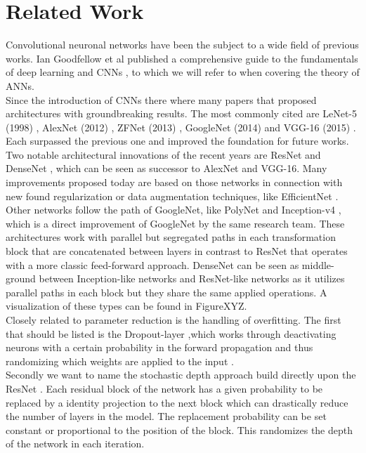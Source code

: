 \documentclass[a4paper,12pt,titlepage,enabledeprecatedfontcommands]{scrreprt}
\begin{document}
\chapter{Related Work}
Convolutional neuronal networks have been the subject to a wide field of previous works. Ian Goodfellow et al published a comprehensive guide to the fundamentals of deep learning and CNNs \cite{Goodfellow-et-al-2016}, to which we will refer to when covering the theory of ANNs. \\
Since the introduction of CNNs there where many papers that proposed architectures with groundbreaking results. The most commonly cited are LeNet-5 (1998) \cite{LeNet}, AlexNet (2012) \cite{AlexNet}, ZFNet (2013) \cite{zeiler2013visualizing}, GoogleNet (2014)\cite{szegedy2014going} and VGG-16 (2015) \cite{simonyan2015deep}. Each surpassed the previous one and improved the foundation for future works.\\ Two notable architectural innovations of the recent years are ResNet \cite{DBLP:journals/corr/HeZRS15} and DenseNet \cite{DBLP:journals/corr/HuangLW16a}, which can be seen as successor to AlexNet and VGG-16. Many improvements proposed today are based on those networks in connection with new found regularization or data augmentation techniques, like EfficientNet \cite{DBLP:journals/corr/abs-1905-11946}. Other networks follow the path of GoogleNet, like PolyNet \cite{DBLP:journals/corr/ZhangLLL16} and Inception-v4 \cite{DBLP:journals/corr/SzegedyIV16}, which is a direct improvement of GoogleNet by the same research team. These architectures work with parallel but segregated paths in each transformation block that are concatenated between layers in contrast to ResNet that operates with a more classic feed-forward approach. DenseNet can be seen as middle-ground between Inception-like networks and ResNet-like networks as it utilizes parallel paths in each block but they share the same applied operations. A visualization of these types can be found in FigureXYZ. \\
Closely related to parameter reduction is the handling of overfitting. The first that should be listed is the Dropout-layer ,which works through deactivating neurons with a certain probability in the forward propagation and thus randomizing which weights are applied to the input \cite{JMLR:v15:srivastava14a}. \\
Secondly we want to name the stochastic depth approach build directly upon the ResNet \cite{DBLP:journals/corr/HuangSLSW16}. Each residual block of the network has a given probability to be replaced by a identity projection to the next block which can drastically reduce the number of layers in the model. The replacement probability can be set constant or proportional to the position of the block. This randomizes the depth of the network in each iteration.
\end{document}

